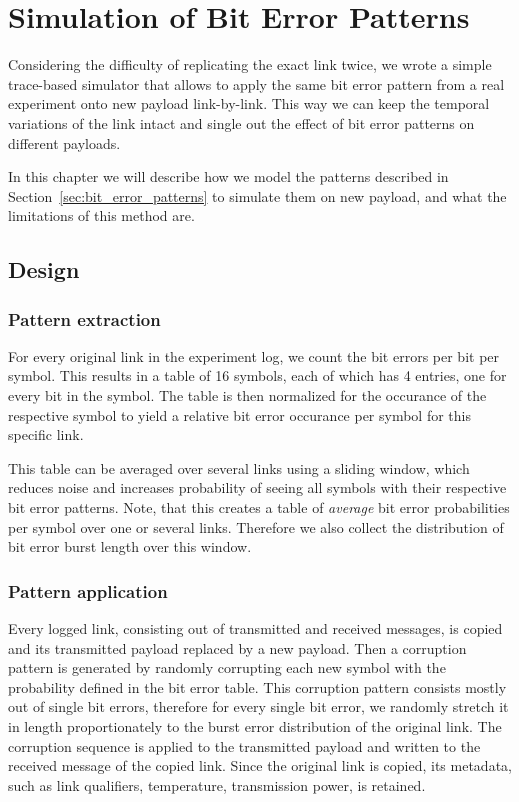 \chapter{Simulation of Bit Error Patterns}

Considering the difficulty of replicating the exact link twice, we wrote a simple trace-based simulator that allows to apply the same bit error pattern from a real experiment onto new payload link-by-link.
This way we can keep the temporal variations of the link intact and single out the effect of bit error patterns on different payloads.

In this chapter we will describe how we model the patterns described in Section~\ref{sec:bit_error_patterns} to simulate them on new payload, and what the limitations of this method are.

\section{Design}

\subsection{Pattern extraction}

For every original link in the experiment log, we count the bit errors per bit per symbol.
This results in a table of 16 symbols, each of which has 4 entries, one for every bit in the symbol.
The table is then normalized for the occurance of the respective symbol to yield a relative bit error occurance per symbol for this specific link.

This table can be averaged over several links using a sliding window, which reduces noise and increases probability of seeing all symbols with their respective bit error patterns.
Note, that this creates a table of \emph{average} bit error probabilities per symbol over one or several links.
Therefore we also collect the distribution of bit error burst length over this window.

\subsection{Pattern application}

Every logged link, consisting out of transmitted and received messages, is copied and its transmitted payload replaced by a new payload.
Then a corruption pattern is generated by randomly corrupting each new symbol with the probability defined in the bit error table.
This corruption pattern consists mostly out of single bit errors, therefore for every single bit error, we randomly stretch it in length proportionately to the burst error distribution of the original link.
The corruption sequence is applied to the transmitted payload and written to the received message of the copied link.
Since the original link is copied, its metadata, such as link qualifiers, temperature, transmission power, is retained.

